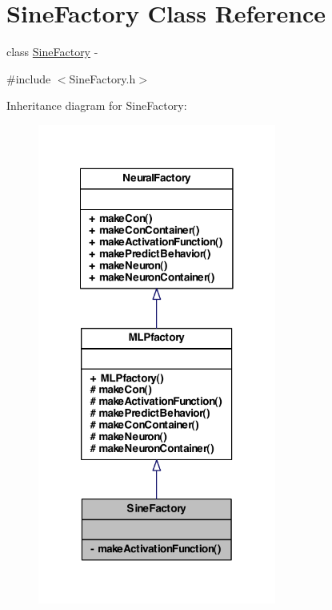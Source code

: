 \hypertarget{class_sine_factory}{
\section{SineFactory Class Reference}
\label{class_sine_factory}
}


class \hyperlink{class_sine_factory}{SineFactory} -\/  




{\ttfamily \#include $<$SineFactory.h$>$}



Inheritance diagram for SineFactory:
\nopagebreak
\begin{figure}[H]
\begin{center}
\leavevmode
\includegraphics[width=222pt]{class_sine_factory__inherit__graph}
\end{center}
\end{figure}


